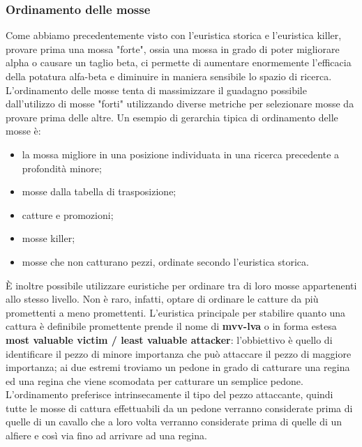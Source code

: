 \subsubsection{Ordinamento delle mosse}
Come abbiamo precedentemente visto con l'euristica storica e l'euristica killer, provare prima una mossa "forte", ossia una mossa in grado di 
poter migliorare alpha o causare un taglio beta, ci permette di aumentare enormemente l'efficacia della potatura alfa-beta e diminuire in maniera 
sensibile lo spazio di ricerca. L'ordinamento delle mosse tenta di massimizzare il guadagno possibile dall'utilizzo di mosse "forti" utilizzando 
diverse metriche per selezionare mosse da provare prima delle altre. Un esempio di gerarchia tipica di ordinamento delle mosse è:
\begin{itemize}
\item la mossa migliore in una posizione individuata in una ricerca precedente a profondità minore;
\item mosse dalla tabella  di trasposizione;
\item catture e promozioni;
\item mosse killer;
\item mosse che non catturano pezzi, ordinate secondo l'euristica storica.
\end{itemize} 
È inoltre possibile utilizzare euristiche per ordinare tra di loro mosse appartenenti allo stesso livello. Non è raro, infatti, optare di ordinare le catture da più promettenti a meno promettenti.
L'euristica principale per stabilire quanto una cattura è definibile promettente prende il nome di \textbf{mvv-lva} o in forma estesa \textbf{most valuable victim / least valuable attacker}: l'obbiettivo è quello di identificare 
il pezzo di minore importanza che può attaccare il pezzo di maggiore importanza; ai due estremi troviamo un pedone in grado di catturare una regina ed una regina che viene scomodata per catturare un semplice pedone.
L'ordinamento preferisce intrinsecamente il tipo del pezzo attaccante, quindi tutte le mosse di cattura effettuabili da un pedone verranno considerate prima di quelle di un cavallo che a loro volta verranno considerate
prima di quelle di un alfiere e così via fino ad arrivare ad una regina. 



